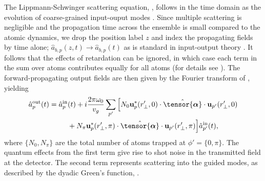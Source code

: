 \documentclass[aps,pra,twocolumn]{revtex4-1} %
\newcommand{\poltens}{\hat{\tensor{\boldsymbol{\alpha}}}}
\begin{document}
The Lippmann-Schwinger scattering equation, , follows in the time domain as the evolution of coarse-grained input-ouput modes \cite{gardiner_input_1985, fan_input-output_2010, le_kien_propagation_2014}.  
Since multiple scattering is negligible and the propagation time across the ensemble is small compared to the atomic dynamics, we drop the position label $z$ and index the propagating fields by time alone; $\hat{a}_{b,p}(z,t) \rightarrow \hat{a}_{b,p}(t) $ as is standard in input-output theory \cite{gardiner_input_1985, stockton_deterministic_2004} . 
It follows that the effects of retardation can be ignored, in which case each term in the sum over atoms contributes equally for all atoms (for details see \cite{le_kien_correlations_2008, baragiola_open_2014}).  
The forward-propagating output fields are then given by the Fourier transform of , yielding \cite{le_kien_correlations_2008} 
\begin{align} \label{Eq::ScatteringSolution}
		\hat{a}^{\rm out}_{p}(t) = \hat{a}^{\rm in}_{p}&(t) + i  \frac{2\pi \omega_0}{v_g}\sum_{p'}\Big[ N_0  \mathbf{u}^*_p(r'_\perp,0) \cdot \poltens \cdot  \mathbf{u}_{p'}(r'_\perp,0)  \nn\\
		&+ N_\pi \mathbf{u}^*_p(r'_\perp,\pi) \cdot \poltens \cdot  \mathbf{u}_{p'}(r'_\perp,\pi) \Big] \hat{a}^{\rm in}_{p'}(t),
	\end{align} 
where $\{N_0,N_\pi \}$ are the total number of atoms trapped at $\phi' = \{0,\pi\}$. The quantum effects from the first term give rise to shot noise in the transmitted field at the detector.  
The second term represents scattering into the guided modes, as described by the dyadic Green's function, .  
\end{document}
